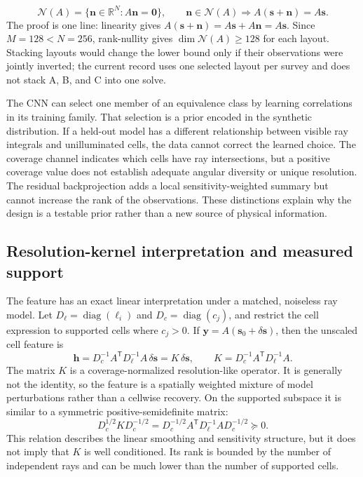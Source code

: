 \documentclass[11pt]{article}
\begin{document}
\begin{equation}
\mathcal{N}(A)=\{\mathbf{n}\in\mathbb{R}^{N}:A\mathbf{n}=\mathbf{0}\},\qquad
\mathbf{n}\in\mathcal{N}(A)\Longrightarrow A(\mathbf{s}+\mathbf{n})=A\mathbf{s}.
\label{eq:nullspace}
\end{equation}
The proof is one line: linearity gives $A(\mathbf{s}+\mathbf{n})=A\mathbf{s}+A\mathbf{n}=A\mathbf{s}$. Since $M=128<N=256$, rank-nullity gives $\dim\mathcal{N}(A)\geq128$ for each layout. Stacking layouts would change the lower bound only if their observations were jointly inverted; the current record uses one selected layout per survey and does not stack A, B, and C into one solve.

The CNN can select one member of an equivalence class by learning correlations in its training family. That selection is a prior encoded in the synthetic distribution. If a held-out model has a different relationship between visible ray integrals and unilluminated cells, the data cannot correct the learned choice. The coverage channel indicates which cells have ray intersections, but a positive coverage value does not establish adequate angular diversity or unique resolution. The residual backprojection adds a local sensitivity-weighted summary but cannot increase the rank of the observations. These distinctions explain why the design is a testable prior rather than a new source of physical information.

\subsection{Resolution-kernel interpretation and measured support}
\label{sec:resolution-kernel}
The feature has an exact linear interpretation under a matched, noiseless ray model. Let $D_{\ell}=\operatorname{diag}(\ell_i)$ and $D_c=\operatorname{diag}(c_j)$, and restrict the cell expression to supported cells where $c_j>0$. If $\mathbf{y}=A(\mathbf{s}_0+\delta\mathbf{s})$, then the unscaled cell feature is
\begin{equation}
\mathbf{h}=D_c^{-1}A^{\mathsf T}D_{\ell}^{-1}A\,\delta\mathbf{s}=K\,\delta\mathbf{s},\qquad
K=D_c^{-1}A^{\mathsf T}D_{\ell}^{-1}A.
\label{eq:feature-resolution}
\end{equation}
The matrix $K$ is a coverage-normalized resolution-like operator. It is generally not the identity, so the feature is a spatially weighted mixture of model perturbations rather than a cellwise recovery. On the supported subspace it is similar to a symmetric positive-semidefinite matrix:
\begin{equation}
D_c^{1/2}KD_c^{-1/2}=D_c^{-1/2}A^{\mathsf T}D_{\ell}^{-1}AD_c^{-1/2}\succeq0.
\label{eq:feature-psd}
\end{equation}
This relation describes the linear smoothing and sensitivity structure, but it does not imply that $K$ is well conditioned. Its rank is bounded by the number of independent rays and can be much lower than the number of supported cells.
\end{document}
